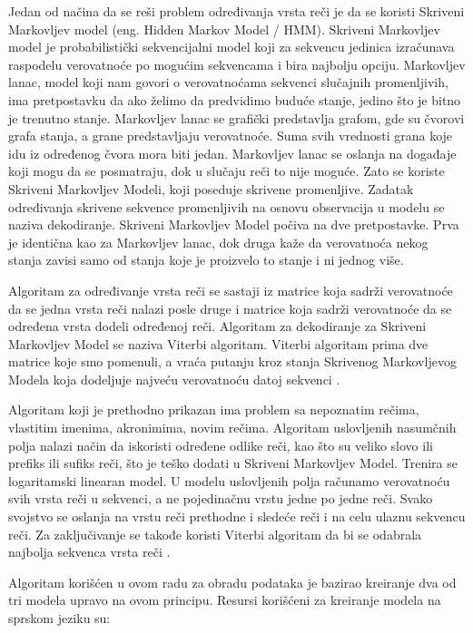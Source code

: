 \documentclass[12pt,oneside]{memoir}
\begin{document}
Jedan od načina da se reši problem određivanja vrsta reči je da se koristi Skriveni Markovljev model (eng. Hidden Markov Model / HMM). Skriveni Markovljev model je probabilistički sekvencijalni model koji za sekvencu jedinica izračunava raspodelu verovatnoće po mogućim sekvencama i bira najbolju opciju. Markovljev lanac, model koji nam govori o verovatnoćama sekvenci slučajnih promenljivih, ima pretpostavku da ako želimo da predvidimo buduće stanje, jedino što je bitno je trenutno stanje. Markovljev lanac se grafički predstavlja grafom, gde su čvorovi grafa stanja, a grane predstavljaju verovatnoće. Suma svih vrednosti grana koje idu iz određenog čvora mora biti jedan. Markovljev lanac se oslanja na događaje koji mogu da se posmatraju, dok u slučaju reči to nije moguće. Zato se koriste Skriveni Markovljev Modeli, koji poseduje skrivene promenljive. Zadatak određivanja skrivene sekvence promenljivih na osnovu observacija u modelu se naziva dekodiranje. Skriveni Markovljev Model počiva na dve pretpostavke. Prva je identična kao za Markovljev lanac, dok druga kaže da verovatnoća nekog stanja zavisi samo od stanja koje je proizvelo to stanje i ni jednog više.

Algoritam za određivanje vrsta reči se sastaji iz matrice koja sadrži verovatnoće da se jedna vrsta reči nalazi posle druge i matrice koja sadrži verovatnoće da se određena vrsta dodeli određenoj reči. Algoritam za dekodiranje za Skriveni Markovljev Model se naziva Viterbi algoritam.  Viterbi algoritam prima dve matrice koje smo pomenuli, a vraća putanju kroz stanja Skrivenog Markovljevog Modela koja dodeljuje najveću verovatnoću datoj sekvenci \cite{postagging}.

Algoritam koji je prethodno prikazan ima problem sa nepoznatim rečima, vlastitim imenima, akronimima, novim rečima. Algoritam uslovljenih nasumčnih polja nalazi način da iskoristi određene odlike reči, kao što su veliko slovo ili prefiks ili sufiks reči, što je teško dodati u Skriveni Markovljev Model. Trenira se logaritamski linearan model. U modelu uslovljenih polja računamo verovatnoću svih vrsta reči u sekvenci, a ne pojedinačnu vrstu jedne po jedne reči. Svako svojstvo se oslanja na vrstu reči prethodne i sledeće reči i na celu ulaznu sekvencu reči. Za zaključivanje se takođe koristi Viterbi algoritam da bi se odabrala najbolja sekvenca vrsta reči \cite{postagging}.

Algoritam korišćen u ovom radu za obradu podataka je bazirao kreiranje dva od tri modela upravo na ovom principu. Resursi korišćeni za kreiranje modela na sprskom jeziku su:
\end{document}
